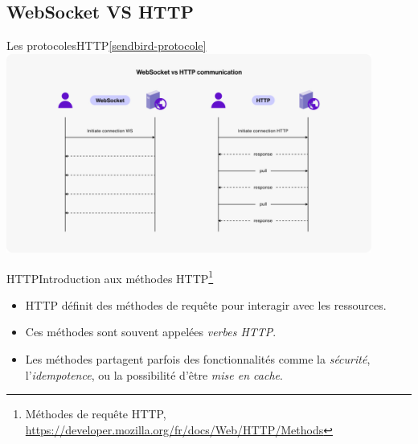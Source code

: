 \documentclass{beamer}
\begin{document}
    \subsection{WebSocket VS HTTP}\label{subsec:ws-vs-http}

    \begin{frame}{Les protocoles}{HTTP\cref{sendbird-protocole}}
        \centering
        \includegraphics[width=12cm]{image/Tutorial-WebSocket-vs.-HTTP-communication-diagram}
    \end{frame}

    \begin{frame}{HTTP}{Introduction aux méthodes HTTP\footnote{\label{mozilla-http-methods}Méthodes de requête HTTP, \url{https://developer.mozilla.org/fr/docs/Web/HTTP/Methods}}}
        \begin{itemize}
            \item HTTP définit des méthodes de requête pour interagir avec les ressources.
            \item Ces méthodes sont souvent appelées \textit{verbes HTTP}.
            \item Les méthodes partagent parfois des fonctionnalités comme la \textit{sécurité}, l'\textit{idempotence}, ou la possibilité d'être \textit{mise en cache}.
        \end{itemize}
    \end{frame}
\end{document}
